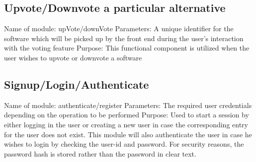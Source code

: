 \subsection{Upvote/Downvote a particular alternative}

Name of module: upVote/downVote
Parameters: A unique identifier for the software which will be picked up by the front end during the user's interaction with the voting feature
Purpose: This functional component is utilized when the user wishes to upvote or downvote a software 

\subsection{Signup/Login/Authenticate}

Name of module: authenticate/register
Parameters: The required user credentials depending on the operation to be performed
Purpose: Used to start a session by either logging in the user or creating a new user in case the corresponding entry for the user does not exist. This module will also authenticate the user in case he wishes to login by checking the user-id and password. For security reasons, the password hash is stored rather than the password in clear text.




